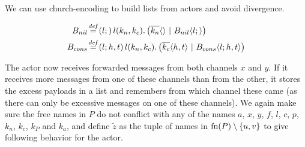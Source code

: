 We can use church-encoding to build lists from actors and avoid divergence.


\begin{align*}
  \adef*{B_{nil}}{l}{}{\arcv{l}{k_n,k_c} . \parens{\asnd{k_n}{} \apar \ains{B_{nil}}{l}{}}}
  \\
  \adef*{B_{cons}}{l}{h,t}{\arcv{l}{k_n,k_c} . \parens{\asnd{k_c}{h,t} \apar \ains{B_{cons}}{l}{h,t}}}
\end{align*}

The actor now receives forwarded messages from both channels $x$ and $y$.
If it receives more messages from one of these channels than from the other,
it stores the excess payloads in a list and remembers from which channel
these came (as there can only be excessive messages on one of these channels).
We again make sure the free names in $P$ do not conflict with any of the names
$a$, $x$, $y$, $f$, $l$, $c$, $p$, $k_n$, $k_c$, $k_P$ and $k_a$,
and define $\tilde{z}$
as the tuple of names in $\operatorname{fn}(P) \setminus {\{u, v\}}$
to give following behavior for the actor.

